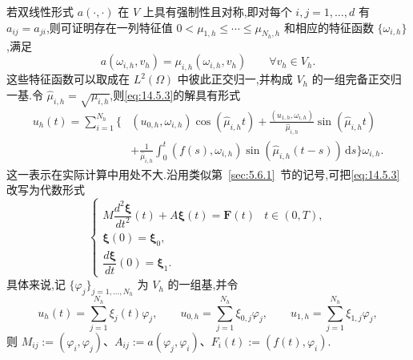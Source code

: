 若双线性形式 \(a(\cdot,\cdot)\) 在 \(V\) 上具有强制性且对称,即对每个 \(i,j=1,\ldots,d\) 有 \(a_{ij}=a_{ji}\),则可证明存在一列特征值 \(0<\mu_{1,h}\le\cdots\le\mu_{N_h,h}\) 和相应的特征函数 \(\{\omega_{i,h}\}\),满足
\begin{equation}\label{eq:14.5.4}
  a(\omega_{i,h},v_h)=\mu_{i,h}(\omega_{i,h},v_h)
      \qquad\forall v_h\in V_h.
\end{equation}
这些特征函数可以取成在 \(L^2(\Omega)\) 中彼此正交归一,并构成 \(V_h\) 的一组完备正交归一基.令 \(\widehat\mu_{i,h}=\sqrt{\mu_{i,h}}\),则\eqref{eq:14.5.3}的解具有形式
\[
  \begin{aligned}
    u_h(t)=\sum_{i=1}^{N_h}\biggl\{&
      (u_{0,h},\omega_{i,h})\cos(\widehat\mu_{i,h}t)
       +\frac{(u_{1,h},\omega_{i,h})}{\widehat\mu_{i,h}}\sin(\widehat\mu_{i,h}t)\\
      &+\frac1{\widehat\mu_{i,h}}\int_0^t
           (f(s),\omega_{i,h})\sin(\widehat\mu_{i,h}(t-s))\,\mathrm ds
       \biggr\}\omega_{i,h}.
  \end{aligned}
\]
这一表示在实际计算中用处不大.沿用类似第~\ref{sec:5.6.1}~节的记号,可把\eqref{eq:14.5.3}改写为代数形式
\begin{equation}\label{eq:14.5.5}
  \begin{cases}
    M\dfrac{d^2\boldsymbol{\xi}}{dt^2}(t)+A\boldsymbol{\xi}(t)=\boldsymbol{F}(t)
         &t\in(0,T),\\[2pt]
    \boldsymbol{\xi}(0)=\boldsymbol{\xi}_0,\\
    \dfrac{d\boldsymbol{\xi}}{dt}(0)=\boldsymbol{\xi}_1.
  \end{cases}
\end{equation}
具体来说,记 \(\{\varphi_j\}_{j=1,\ldots,N_h}\) 为 \(V_h\) 的一组基,并令
\[
  u_h(t)=\sum_{j=1}^{N_h}\xi_j(t)\varphi_j,\qquad
  u_{0,h}=\sum_{j=1}^{N_h}\xi_{0,j}\varphi_j,\qquad
  u_{1,h}=\sum_{j=1}^{N_h}\xi_{1,j}\varphi_j,
\]
则 \(M_{ij}:=(\varphi_i,\varphi_j)\)、\(A_{ij}:=a(\varphi_j,\varphi_i)\)、\(F_i(t):=(f(t),\varphi_i)\).

